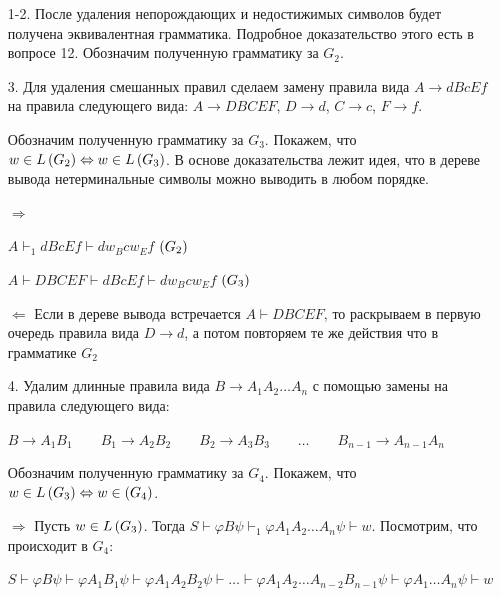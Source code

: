 \begin{itemize}
    \item[1-2.] После удаления непорождающих и недостижимых символов будет получена эквивалентная грамматика. Подробное доказательство этого есть в вопросе 12. Обозначим полученную грамматику за $G_2$.

    \item[3.] Для удаления смешанных правил сделаем замену правила вида $A \rightarrow d B c E f$ на правила следующего вида:
    $A \rightarrow D B C E F$, 
    $D \rightarrow d$, 
    $C \rightarrow c$, 
    $F \rightarrow f$.

Обозначим полученную грамматику за $G_3$. Покажем, что $w \in L \left({G_2}\right) \Leftrightarrow w \in L \left({G_3}\right)$. В основе доказательства лежит идея, что в дереве вывода нетерминальные символы можно выводить в любом порядке.

$\Rightarrow$
\begin{center}
    $A \vdash_1 dBcEf \vdash dw_B c w_E f$ $\left({G_2}\right)$
    
    $A \vdash DBCEF \vdash dBcEf \vdash d w_B c w_E f$ $\left({G_3}\right)$ 
\end{center}

$\Leftarrow$ Если в дереве вывода встречается $A \vdash DBCEF$, то раскрываем в первую очередь правила вида $D \rightarrow d$, а потом повторяем те же действия что в грамматике $G_2$ 

    \item[4.] Удалим длинные правила вида $B \rightarrow A_1 A_2 \dots A_n$ с помощью замены на правила следующего вида:

\begin{center}
    $B \rightarrow A_1 B_1 \qquad B_1 \rightarrow A_2 B_2 \qquad B_2 \rightarrow A_3 B_3 \qquad \ldots \qquad B_{n - 1} \rightarrow A_{n - 1} A_n$
\end{center}

Обозначим полученную грамматику за $G_4$. Покажем, что $w \in L \left({G_3}\right) \Leftrightarrow w \in \left({G_4}\right)$.

$\Rightarrow$ Пусть $w \in L \left({G_3}\right)$. Тогда $S \vdash \varphi B \psi \vdash_1 \varphi A_1 A_2 \dots A_n \psi \vdash w$. Посмотрим, что происходит в $G_4$:
\begin{center}
    $S \vdash \varphi B \psi \vdash \varphi A_1 B_1 \psi \vdash \varphi A_1 A_2 B_2 \psi \vdash \dots \vdash \varphi A_1 A_2 \dots A_{n - 2} B_{n - 1} \psi \vdash \varphi A_1 \dots A_n \psi \vdash w$
\end{center}


\end{itemize}

